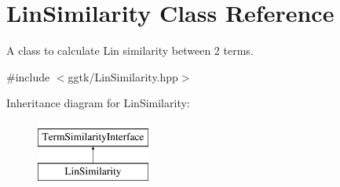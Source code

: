 \hypertarget{classLinSimilarity}{}\section{Lin\+Similarity Class Reference}
\label{classLinSimilarity}


A class to calculate Lin similarity between 2 terms.  




{\ttfamily \#include $<$ggtk/\+Lin\+Similarity.\+hpp$>$}

Inheritance diagram for Lin\+Similarity\+:\begin{figure}[H]
\begin{center}
\leavevmode
\includegraphics[height=2.000000cm]{classLinSimilarity}
\end{center}
\end{figure}
